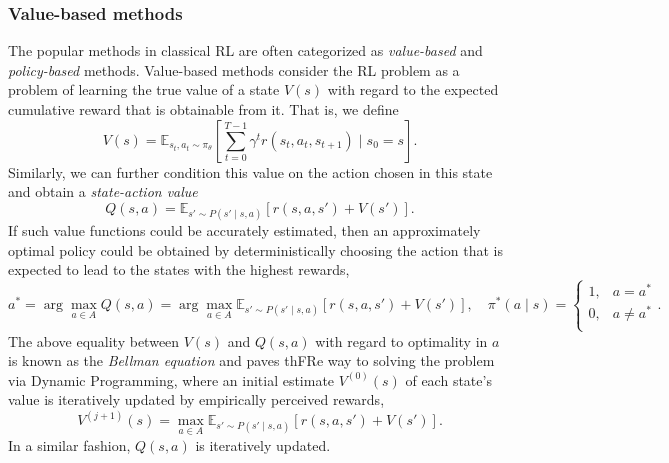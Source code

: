 \documentclass[a4paper, 11pt]{article}
\begin{document}
	\subsubsection{Value-based methods}
	The popular methods in classical RL are often categorized as \textit{value-based} and \textit{policy-based} methods. 
	Value-based methods consider the RL problem as a problem of learning the true value of a state $V(s)$ with regard to the expected cumulative reward that is obtainable from it. That is, we define 
	\[V(s)=\mathbb{E}_{s_t,a_t\sim \pi_\theta}\left[\sum_{t=0}^{T-1}\gamma^t r(s_t,a_t,s_{t+1})\mid s_0=s\right].\]
	Similarly, we can further condition this value on the action chosen in this state and obtain a \textit{state-action value}
	\[Q(s,a)=\mathbb{E}_{s'\sim P(s'\mid s,a)}\left[r(s,a,s')+V(s')\right].\]
	If such value functions could be accurately estimated, then an approximately optimal policy could be obtained by deterministically choosing the action that is expected to lead to the states with the highest rewards,
	\[a^{*}=\arg \max_{a\in A}Q(s,a) = \arg \max_{a\in A}\mathbb{E}_{s'\sim P(s'\mid s,a)}\left[r(s,a,s')+V(s')\right],\quad \pi^{*}(a\mid s)=\begin{cases}
		1, & a=a^{*}\\
		0, & a\neq a^{*}\\
	\end{cases}.\]
	The above equality between $V(s)$ and $Q(s,a)$ with regard to optimality in $a$ is known as the \textit{Bellman equation} and paves thFRe way to solving the problem via Dynamic Programming, where an initial estimate $V^{(0)}(s)$ of each state's value is iteratively updated by empirically perceived rewards,
	\[V^{(j+1)}(s)=\max_{a\in A}\mathbb{E}_{s'\sim P(s'\mid s,a)}\left[r(s,a,s')+V(s')\right].\]
	In a similar fashion, $Q(s,a)$ is iteratively updated.
\end{document}
